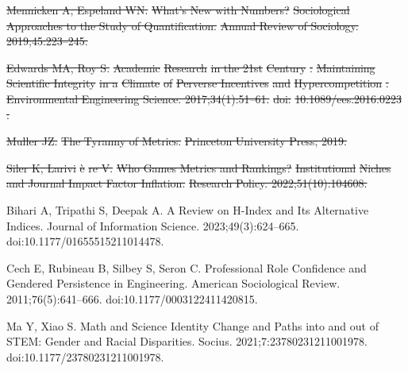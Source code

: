 \documentclass[
  10pt,
  letterpaper,
]{article}
\providecommand{\DIFdeltex}[1]{{\protect\color{red}\sout{#1}}}                      %
\providecommand{\DIFdelend}{} %
\providecommand{\DIFdel}[1]{\texorpdfstring{\DIFdeltex{#1}}{}} %
\DeclareRobustCommand{\DIFdelend}{\DIFOaddend \let\includegraphics\DIFOincludegraphics} %
\begin{document}
\begin{thebibliography}{10}
\DIFdel{Mennicken A, Espeland WN.
}%
\DIFdel{What's New with Numbers? }%
\DIFdel{Sociological}%
\DIFdel{Approaches to the Study of Quantification.
}%
\DIFdel{Annual Review of Sociology. 2019;45:223--245.
}%

\DIFdel{Edwards MA, Roy S.
}%
\DIFdel{Academic }%
\DIFdel{Research}%
\DIFdel{in the 21st }%
\DIFdel{Century}%
\DIFdel{: }%
\DIFdel{Maintaining Scientific Integrity}%
\DIFdel{in a }%
\DIFdel{Climate}%
\DIFdel{of }%
\DIFdel{Perverse Incentives}%
\DIFdel{and }%
\DIFdel{Hypercompetition}%
\DIFdel{.
}%
\DIFdel{Environmental Engineering Science. 2017;34(1):51--61.
}%
\DIFdel{doi:}%
\DIFdel{10.1089/ees.2016.0223}%
\DIFdel{.
}%

\DIFdel{Muller JZ.
}%
\DIFdel{The Tyranny of Metrics.
}%
\DIFdel{Princeton University Press; 2019.
}%

\DIFdel{Siler K, Larivi}%
\DIFdel{\`e}%
\DIFdel{re V.
}%
\DIFdel{Who Games Metrics and Rankings? }%
\DIFdel{Institutional}%
\DIFdel{Niches and Journal Impact Factor Inflation.
}%
\DIFdel{Research Policy. 2022;51(10):104608.
}%

\DIFdelend {}
Bihari A, Tripathi S, Deepak A.
\newblock A Review on H-Index and Its Alternative Indices.
\newblock Journal of Information Science. 2023;49(3):624--665.
\newblock doi:{10.1177/01655515211014478}.

Cech E, Rubineau B, Silbey S, Seron C.
\newblock Professional {{Role Confidence}} and {{Gendered Persistence}} in {{Engineering}}.
\newblock American Sociological Review. 2011;76(5):641--666.
\newblock doi:{10.1177/0003122411420815}.

Ma Y, Xiao S.
\newblock Math and {{Science Identity Change}} and {{Paths}} into and out of {{STEM}}: {{Gender}} and {{Racial Disparities}}.
\newblock Socius. 2021;7:23780231211001978.
\newblock doi:{10.1177/23780231211001978}.


\end{thebibliography}
\end{document}
